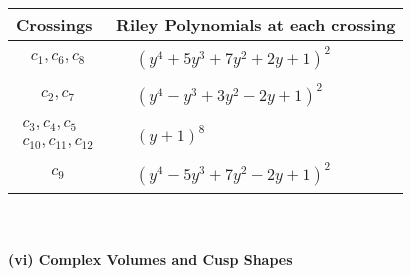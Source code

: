 \documentclass[1p]{elsarticle_modified}
\theoremstyle{definition}
\begin{document}
\begin{tabular}{m{50pt}|m{274pt}}
Crossings & \hspace{64pt}Riley Polynomials at each crossing \\
\hline $$\begin{aligned}c_{1},c_{6},c_{8}\end{aligned}$$&$\begin{aligned}
&(y^4+5 y^3+7 y^2+2 y+1)^2
\end{aligned}$\\
\hline $$\begin{aligned}c_{2},c_{7}\end{aligned}$$&$\begin{aligned}
&(y^4- y^3+3 y^2-2 y+1)^2
\end{aligned}$\\
\hline $$\begin{aligned}c_{3},c_{4},c_{5}\\c_{10},c_{11},c_{12}\end{aligned}$$&$\begin{aligned}
&(y+1)^8
\end{aligned}$\\
\hline $$\begin{aligned}c_{9}\end{aligned}$$&$\begin{aligned}
&(y^4-5 y^3+7 y^2-2 y+1)^2
\end{aligned}$\\
\hline
\end{tabular}\\~\\
\newpage\flushleft \textbf{(vi) Complex Volumes and Cusp Shapes}
\end{document}
